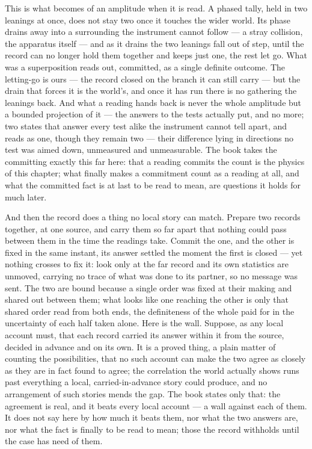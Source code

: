 This is what becomes of an amplitude when it is read. A phased tally, held in two leanings at once, does not
stay two once it touches the wider world. Its phase drains away into a surrounding the instrument cannot follow
--- a stray collision, the apparatus itself --- and as it drains the two leanings fall out of step, until the
record can no longer hold them together and keeps just one, the rest let go. What was a superposition reads out,
committed, as a single definite outcome. The letting-go is ours --- the record closed on the branch it can
still carry --- but the drain that forces it is the world's, and once it has run there is no gathering the
leanings back. And what a reading hands back is never the whole
amplitude but a bounded projection of it --- the answers to the tests actually put, and no more; two states that
answer every test alike the instrument cannot tell apart, and reads as one, though they remain two --- their
difference lying in directions no test was aimed down, unmeasured and unmeasurable. The book takes the committing exactly this far here: that a reading
commits the count is the physics of this chapter; what finally makes a commitment count as a reading at all, and
what the committed fact is at last to be read to mean, are questions it holds for much later.

And then the record does a thing no local story can match. Prepare two records together, at one source, and
carry them so far apart that nothing could pass between them in the time the readings take. Commit the one, and
the other is fixed in the same instant, its answer settled the moment the first is closed --- yet nothing
crosses to fix it: look only at the far record and its own statistics are unmoved, carrying no trace of what was
done to its partner, so no message was sent. The two are bound because a single order was fixed at their making
and shared out between them; what looks like one reaching the other is only that shared order read from both
ends, the definiteness of the whole paid for in the uncertainty of each half taken alone. Here is the wall. Suppose, as any local account must, that each
record carried its answer within it from the source, decided in advance and on its own. It is a proved thing, a
plain matter of counting the possibilities, that no such account can make the two agree as closely as they are
in fact found to agree; the correlation the world actually shows runs past everything a local, carried-in-advance
story could produce, and no arrangement of such stories mends the gap. The book states only that: the agreement
is real, and it beats every local account --- a wall against each of them. It does not say here by how much it
beats them, nor what the two answers are, nor what the fact is finally to be read to mean; those the record
withholds until the case has need of them.

